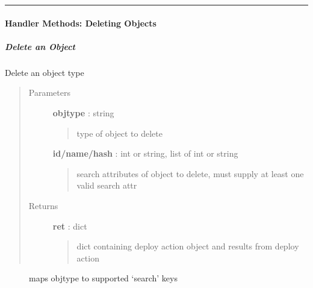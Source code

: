 \documentclass[letterpaper,10pt,english]{sphinxmanual}
\begin{document}
\bigskip\hrule{}\bigskip



\paragraph{Handler Methods: Deleting Objects}
\label{pytan.handler:handler-methods-deleting-objects}

\subparagraph{Delete an Object}
\label{pytan.handler:delete-an-object}

\begin{fulllineitems}
\label{pytan.handler:pytan.handler.Handler.delete}
Delete an object type
\begin{quote}\begin{description}
\item[{Parameters}] \leavevmode
\textbf{objtype} : string
\begin{quote}

type of object to delete
\end{quote}

\textbf{id/name/hash} : int or string, list of int or string
\begin{quote}

search attributes of object to delete, must supply at least one valid search attr
\end{quote}

\item[{Returns}] \leavevmode
\textbf{ret} : dict
\begin{quote}

dict containing deploy action object and results from deploy action
\end{quote}

\end{description}\end{quote}



\begin{description}
\item[{{\hyperref[pytan.constants:pytan.constants.GET_OBJ_MAP]{}}}] \leavevmode
maps objtype to supported `search' keys

\end{description}



\end{fulllineitems}
\end{document}
